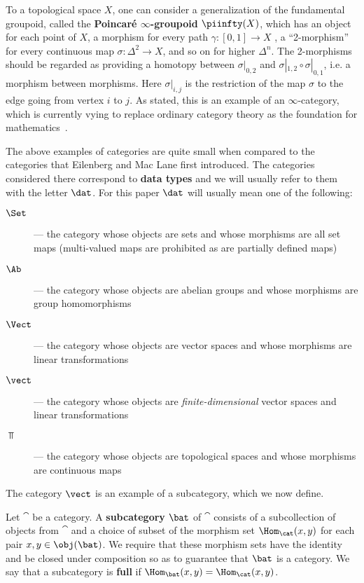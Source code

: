 \begin{rmk}
	To a topological space $X$, one can consider a generalization of the fundamental groupoid, called the \textbf{Poincar\'e $\infty$-groupoid} $\piinfty(X)$, which has an object for each point of $X$, a morphism for every path $\gamma:[0,1]\to X$ , a ``2-morphism'' for every continuous map $\sigma:\Delta^2\to X$, and so on for higher $\Delta^n$. The 2-morphisms should be regarded as providing a homotopy between $\sigma|_{0,2}$ and $\sigma|_{1,2}\circ\sigma|_{0,1}$, i.e. a morphism between morphisms. Here $\sigma|_{i,j}$ is the restriction of the map $\sigma$ to the edge going from vertex $i$ to $j$. As stated, this is an example of an $\infty$-category, which is currently vying to replace ordinary category theory as the foundation for mathematics~\cite{lurie-htt}.  
\end{rmk}

The above examples of categories are quite small when compared to the categories that Eilenberg and Mac Lane first introduced. The categories considered there correspond to \textbf{data types} and we will usually refer to them with the letter $\dat$. For this paper $\dat$ will usually mean one of the following: 
\begin{description}
	\item[$\Set$] --- the category whose objects are sets and whose morphisms are all set maps (multi-valued maps are prohibited as are partially defined maps)
	\item[$\Ab$] --- the category whose objects are abelian groups and whose morphisms are group homomorphisms
	\item[$\Vect$] --- the category whose objects are vector spaces and whose morphisms are linear transformations
	\item[$\vect$] --- the category whose objects are \emph{finite-dimensional} vector spaces and linear transformations
	\item[$\Top$] --- the category whose objects are topological spaces and whose morphisms are continuous maps
\end{description}
The category $\vect$ is an example of a subcategory, which we now define.
\begin{defn}[Subcategories]
	Let $\cat$ be a category. A \textbf{subcategory} $\bat$ of $\cat$ consists of a subcollection of objects from $\cat$ and a choice of subset of the morphism set $\Hom_{\cat}(x,y)$ for each pair $x,y\in\obj(\bat)$. We require that these morphism sets have the identity and be closed under composition so as to guarantee that $\bat$ is a category. We say that a subcategory is \textbf{full} if $\Hom_{\bat}(x,y)=\Hom_{\cat}(x,y)$. 
\end{defn}

